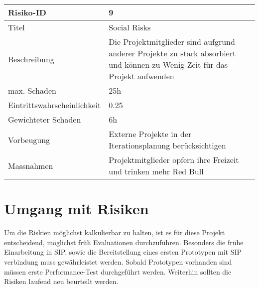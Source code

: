 \noindent
\begin{tabular}{|p{} | p{} |}
	\hline
	Risiko-ID & 9 \\
	\hline
	Titel & Social Risks \\
	Beschreibung & Die Projektmitglieder sind aufgrund anderer Projekte zu stark absorbiert und können zu Wenig Zeit für das Projekt aufwenden \\
	max. Schaden & 25h \\
	Eintrittswahrscheinlichkeit & 0.25 \\
	Gewichteter Schaden	& 6h \\
	Vorbeugung	& Externe Projekte in der Iterationsplanung berücksichtigen \\
	Massnahmen	& Projektmitglieder opfern ihre Freizeit und trinken mehr Red Bull \\
	\hline
\end{tabular}
\hspace{0.5cm}
\newline


\section{Umgang mit Risiken}
Um die Riskien möglichst kalkulierbar zu halten, ist es für diese Projekt entscheidend, möglichst früh
Evaluationen durchzuführen. Besonders die frühe Einarbeitung in SIP, sowie die Bereitstellung eines ersten
Prototypen mit SIP verbindung muss gewährleistet werden. Sobald Prototypen vorhanden sind müssen erste
Performance-Test durchgeführt werden. Weiterhin sollten die Risiken laufend neu beurteilt werden.
